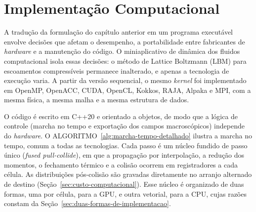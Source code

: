 
\chapter{Implementação Computacional}\label{ch:implementacao-computacional}






A tradução da formulação do capítulo anterior em um programa executável envolve decisões que afetam o desempenho, a portabilidade entre fabricantes de \textit{hardware} e a manutenção do código.
O miniaplicativo de dinâmica dos fluidos computacional isola essas decisões: o método de Lattice Boltzmann (LBM) para escoamentos compressíveis permanece inalterado, e apenas a tecnologia de execução varia.
A partir da versão sequencial, o mesmo \textit{kernel} foi implementado em OpenMP, OpenACC, CUDA, OpenCL, Kokkos, RAJA, Alpaka e MPI, com a mesma física, a mesma malha e a mesma estrutura de dados.

O código é escrito em C++20 e orientado a objetos, de modo que a lógica de controle (marcha no tempo e exportação dos campos macroscópicos) independe do \textit{hardware}.
O ALGORITMO~\ref{alg:marcha-tempo-detalhado} ilustra a marcha no tempo, comum a todas as tecnologias.
Cada passo é um núcleo fundido de passo único (\textit{fused pull-collide}), em que a propagação por interpolação, a redução dos momentos, o fechamento térmico e a colisão ocorrem em registradores a cada célula.
As distribuições pós-colisão são gravadas diretamente no arranjo alternado de destino (Seção~\ref{sec:custo-computacional}).
Esse núcleo é organizado de duas formas, uma por célula, para a GPU, e outra vetorial, para a CPU, cujas razões constam da Seção~\ref{sec:duas-formas-de-implementacao}.

